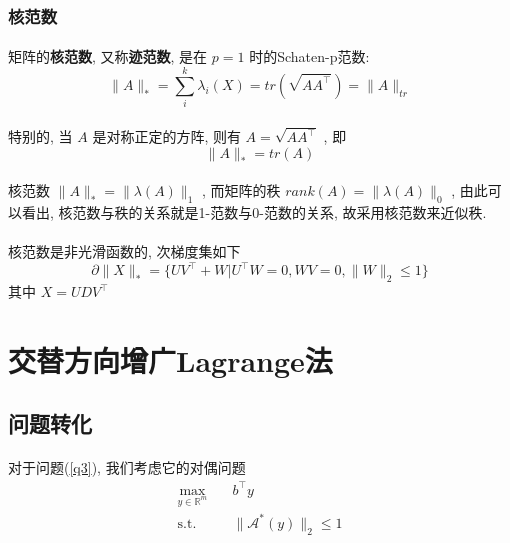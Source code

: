 \documentclass[a4paper, UTF8]{ctexart}
\numberwithin{equation}{section}  %
\begin{document}
			\subsubsection{核范数}
				\paragraph{}
					\quad 矩阵的\textbf{核范数}, 又称\textbf{迹范数}, 是在 $p = 1$ 时的Schaten-p范数:
					\[
							\lVert{A}\rVert_*
						=	\sum_i^k \lambda_i(X)
						=	tr(\sqrt{A A^\top})
						=	\lVert{A}\rVert_{tr}
					\]

				\paragraph{}
					\quad 特别的, 当 $A$ 是对称正定的方阵, 则有 $ A = \sqrt{A A^\top}$ , 即
					\[
						\lVert{A}\rVert_* = tr(A)
					\]

				\paragraph{}
					\quad 核范数 $\lVert{A}\rVert_* = \lVert{\lambda(A)}\rVert_1$ , 而矩阵的秩 $rank(A) = \lVert{\lambda(A)}\rVert_0$ , 由此可以看出, 核范数与秩的关系就是1-范数与0-范数的关系, 故采用核范数来近似秩.

				\paragraph{}
					\quad 核范数是非光滑函数的, 次梯度集如下
					\begin{equation}\label{NuNormSubGrad}
							\partial \lVert{X}\rVert_*
						=	\{U V^\top + W \vert U^\top W = 0,WV = 0, \lVert{W}\rVert_2 \leq 1\}
					\end{equation}
					其中 $X = U D V^\top$

	\section{交替方向增广Lagrange法}
		\subsection{问题转化}
			\paragraph{}
				\quad 对于问题(\ref{q3}), 我们考虑它的对偶问题
				\begin{equation}
					\begin{split}\label{dual1}
						\max_{y \in \mathbb{R}^{m}} \quad
							& b^\top y\\
						\text{s.t.} \quad
							& \lVert{\mathcal{A}^*(y)}\rVert_2 \le 1\\
					\end{split}
				\end{equation}
\end{document}
